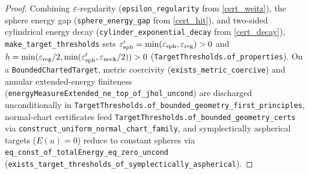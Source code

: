 \begin{proof}\leanok Combining $\varepsilon$-regularity (\texttt{epsilon\_regularity} from \cref{cert_weitz}),
the sphere energy gap (\texttt{sphere\_energy\_gap} from \cref{cert_hit}), and two-sided cylindrical
energy decay (\texttt{cylinder\_exponential\_decay} from \cref{cert_decay}),
\texttt{make\_target\_thresholds} sets $\varepsilon_{\mathrm{sph}}'=\min(\varepsilon_{\mathrm{sph}},\varepsilon_{\mathrm{reg}})>0$
and $h=\min(\varepsilon_{\mathrm{reg}}/2,\min(\varepsilon_{\mathrm{sph}}',\varepsilon_{\mathrm{neck}}/2))>0$
(\texttt{TargetThresholds.of\_properties}). On a \texttt{BoundedChartedTarget}, metric coercivity
(\texttt{exists\_metric\_coercive}) and annular extended-energy finiteness
(\texttt{energyMeasureExtended\_ne\_top\_of\_jhol\_uncond}) are discharged unconditionally in
\texttt{TargetThresholds.of\_bounded\_geometry\_first\_principles}, normal-chart certificates feed
\texttt{TargetThresholds.of\_bounded\_geometry\_certs} via \texttt{construct\_uniform\_normal\_chart\_family},
and symplectically aspherical targets ($E(u)=0$) reduce to constant spheres via
\texttt{eq\_const\_of\_totalEnergy\_eq\_zero\_uncond} (\texttt{exists\_target\_thresholds\_of\_symplectically\_aspherical}).\end{proof}


